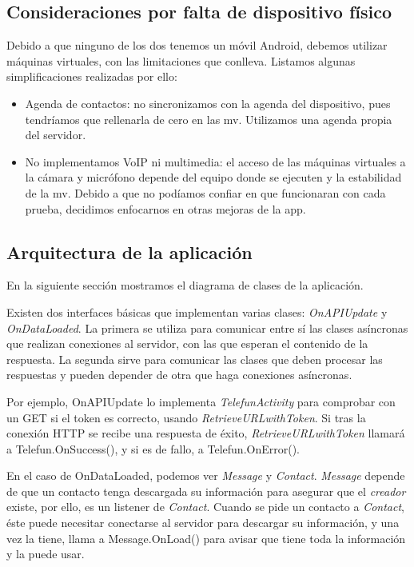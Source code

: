 \documentclass[]{article}
\begin{document}
\subsection{Consideraciones por falta de dispositivo físico}

Debido a que ninguno de los dos tenemos un móvil Android, debemos utilizar máquinas virtuales, con las limitaciones que conlleva. Listamos algunas simplificaciones realizadas por ello:

\begin{itemize}
	\item Agenda de contactos: no sincronizamos con la agenda del dispositivo, pues tendríamos que rellenarla de cero en las mv. Utilizamos una agenda propia del servidor.
	\item No implementamos VoIP ni multimedia: el acceso de las máquinas virtuales a la cámara y micrófono depende del equipo donde se ejecuten y la estabilidad de la mv. Debido a que no podíamos confiar en que funcionaran con cada prueba, decidimos enfocarnos en otras mejoras de la app.
\end{itemize}

\subsection{Arquitectura de la aplicación}

En la siguiente sección mostramos el diagrama de clases de la aplicación.

\hfill

Existen dos interfaces básicas que implementan varias clases: \textit{OnAPIUpdate} y \textit{OnDataLoaded}. La primera se utiliza para comunicar entre sí las clases asíncronas que realizan conexiones al servidor, con las que esperan el contenido de la respuesta. La segunda sirve para comunicar las clases que deben procesar las respuestas y pueden depender de otra que haga conexiones asíncronas.

Por ejemplo, OnAPIUpdate lo implementa \textit{TelefunActivity} para comprobar con un GET si el token es correcto, usando \textit{RetrieveURLwithToken}. Si tras la conexión HTTP se recibe una respuesta de éxito, \textit{RetrieveURLwithToken} llamará a Telefun.OnSuccess(), y si es de fallo, a Telefun.OnError().

En el caso de OnDataLoaded, podemos ver \textit{Message} y \textit{Contact}. \textit{Message} depende de que un contacto tenga descargada su información para asegurar que el \textit{creador} existe, por ello, es un listener de \textit{Contact}. Cuando se pide un contacto a \textit{Contact}, éste puede necesitar conectarse al servidor para descargar su información, y una vez la tiene, llama a Message.OnLoad() para avisar que tiene toda la información y la puede usar.
\end{document}

